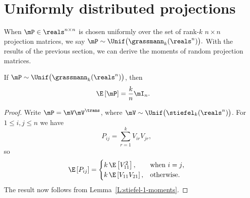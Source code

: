 \section{Uniformly distributed projections}

When $\mP \in \reals^{n \times n}$ is chosen uniformly over the set of rank-$k$ $n\times n$ projection matrices, we say
\(
    \mP
        \sim
            \Unif \big(
                \grassmann_k(\reals^n)
            \big).
\)
With the results of the previous section, we can derive the moments of
random projection matrices.


\begin{lemma}\label{L:grassman-moments-1}
    If $\mP \sim \Unif \big( \grassmann_k(\reals^n) \big)$, then
    \begin{align*}
        \E \left[ \mP \right] &= \frac{k}{n} \mI_n.
    \end{align*}
\end{lemma}
\begin{proof}
    Write $\mP = \mV \mV^\trans$, where 
    \(
        \mV \sim \Unif \big( \stiefel_k( \reals^n ) \big)
    \).
    For $1 \leq i,j \leq n$ we have
    \[
        P_{ij}
            =
                \sum_{r=1}^k V_{ir} V_{jr},
    \]
    so
    \[
        \E \left[ P_{ij} \right] 
        =
        \begin{cases}
            k \, \E \left[ V_{11}^2 \right], &\text{when $i = j$,} \\
            k \, \E \left[ V_{11} V_{21} \right], &\text{otherwise.}
        \end{cases}
    \]
    The result now follows from Lemma~\ref{L:stiefel-1-moments}.
\end{proof}

